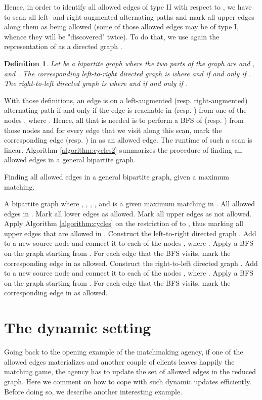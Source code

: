 \documentclass[times, 11pt]{article}
\newtheorem{definition}[theorem]{Definition}
\begin{document}
Hence, in order to identify all allowed edges of type II with respect to , we have to scan all left- and right-augmented alternating paths and mark all upper
edges along them as being allowed
(some of those allowed edges may be of type I, whence they will be "discovered" twice).
To do that, we use again the representation of  as a directed graph .

\begin{definition} Let  be a bipartite graph where the two parts of the
graph are  and , and .
The corresponding left-to-right directed graph is 
where  and  if and only if . The
right-to-left directed graph is 
where  and  if and only if .
\end{definition}


With those definitions, an edge  is on a left-augmented (resp. right-augmented)
alternating path if and only if the edge  is reachable in  (resp. ) from one
of the nodes , where . Hence, all that is needed is to perform a BFS of  (resp. ) from those nodes
and for every edge  that we visit along this scan, mark the corresponding edge  (resp. ) in  as an allowed edge.
The runtime of such a scan is linear. Algorithm \ref{algorithm:cycles2} summarizes the procedure of finding all allowed edges in a general bipartite graph.

\begin{algorithm}[h!!]
\caption{\label{algorithm:cycles2} Finding all allowed edges in a general bipartite graph, given a maximum matching.}
\begin{algorithmic}[1]
\INPUT A bipartite graph  where ,
, , ,
and  is a given maximum matching in .
\OUTPUT All allowed edges in .
\STATE Mark all lower edges as allowed.
\STATE Mark all upper edges as not allowed.
\STATE Apply Algorithm \ref{algorithm:cycles} on the restriction  of  to , thus marking all upper edges that are allowed in .
\STATE Construct the left-to-right directed graph .
\STATE Add to  a new source node  and connect it to each of the nodes
, where .
\STATE Apply a BFS on the graph  starting from . For each edge  that the BFS visits,
mark the corresponding edge  in  as allowed.
\STATE Construct the right-to-left directed graph .
\STATE Add to  a new source node  and connect it to each of the nodes
, where .
\STATE Apply a BFS on the graph  starting from . For each edge  that the BFS visits,
mark the corresponding edge  in  as allowed.
\end{algorithmic}
\end{algorithm}

\section{The dynamic setting}\label{disc3}
Going back to the opening example of the matchmaking agency, if one of the allowed edges materializes and
another couple of clients leaves happily the matching game, the agency has to update the set of allowed edges in the reduced graph.
Here we comment on how to cope with such dynamic updates efficiently. Before doing so, we describe another interesting example.
\end{document}
